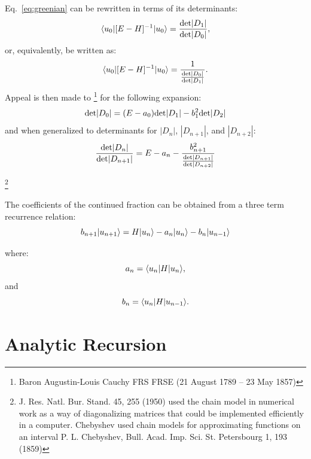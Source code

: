 Eq.~\ref{eq:greenian} can be rewritten in terms of its determinants:
%
\begin{equation}
\label{eq:greendet}
\langle u_{0}|[E-H]^{-1}|u_{0}\rangle = \frac{{\rm det}|D_{1}|}{{\rm det}|D_{0}|},
\end{equation}
%
or, equivalently, be written as:
%
\begin{equation}
\label{eq:greendet}
\langle u_{0}|[E-H]^{-1}|u_{0}\rangle = \frac{1}{\frac{{\rm det}|D_{0}|}{{\rm det}|D_{1}|}}.
\end{equation}
%
Appeal is then made to \footnote{Baron Augustin-Louis Cauchy FRS FRSE (21 August 1789 – 23 May 1857)} 
for the following expansion:
%
\begin{equation}
\label{eq:cauchy}
{\rm det}|D_{0}| = (E-a_{0}){\rm det}|D_{1}|-b^{2}_{1}{\rm det}|D_{2}|
\end{equation}
%
and when generalized to determinants for $|D_{n}|$, $|D_{n+1}|$, and $|D_{n+2}|$:
%
\begin{equation}
\frac{{\rm det}|D_{n}|}{{\rm det}|D_{n+1}|} = E-a_{n}-\frac{b^{2}_{n+1}}{\frac{{\rm det}|D_{n+1}|}{{\rm det}|D_{n+2}|}}
\end{equation}

\footnote{
 J. Res. Natl. Bur. Stand. 45, 255 (1950) 
used the chain model in numerical work as a way of diagonalizing matrices
that could be implemented efficiently in a computer.
Chebyshev used chain models for approximating functions on an interval
P. L. Chebyshev, Bull. Acad. Imp. Sci. St. Petersbourg 1, 193 (1859)}

The coefficients of the continued fraction can be obtained from
a three term recurrence relation:
%
\begin{equation}
b_{n+1}|u_{n+1}\rangle = H |u_{n}\rangle - a_{n}|u_{n}\rangle - b_{n}|u_{n-1}\rangle
\end{equation}

where:
\begin{equation}
a_{n} = \langle u_{n}|H|u_{n} \rangle,
\end{equation}
and 
\begin{equation}
b_{n} = \langle u_{n}|H|u_{n-1} \rangle.
\end{equation}

\section{Analytic Recursion}
